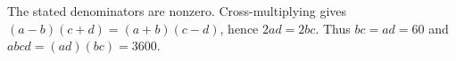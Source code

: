 The stated denominators are nonzero. Cross-multiplying gives $(a-b)(c+d)=(a+b)(c-d)$, hence $2ad=2bc$. Thus $bc=ad=60$ and $abcd=(ad)(bc)=\boxed{3600}$.
